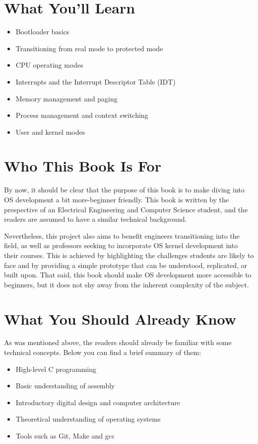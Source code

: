 \section{What You'll Learn}

\begin{itemize}
  \item Bootloader basics
  \item Transitioning from real mode to protected mode
  \item CPU operating modes
  \item Interrupts and the Interrupt Descriptor Table (IDT)
  \item Memory management and paging
  \item Process management and context switching
  \item User and kernel modes
\end{itemize}

\section{Who This Book Is For}

By now, it should be clear that the purpose of this book is to make diving into OS development a bit more-beginner friendly.
This book is written by the prespective of an Electrical Engineering and Computer Science student, and the readers are assumed
to have a similar technical background.

Nevertheless, this project also aims to benefit engineers transitioning into the field, as well as professors seeking to 
incorporate OS kernel development into their courses. This is achieved by highlighting the challenges students are likely to face 
and by providing a simple prototype that can be understood, replicated, or built upon. That said, this book should make OS 
development more accessible to beginners, but it does not shy away from the inherent complexity of the subject.

\section{What You Should Already Know}

As was mentioned above, the readers should already be familiar with some technical concepts.
Below you can find a brief summary of them:

\begin{itemize}
    \item High-level C programming
    \item Basic understanding of assembly
    \item Introductory digital design and computer architecture
    \item Theoretical understanding of operating systems
    \item Tools such as Git, Make and gcc
  \end{itemize}

